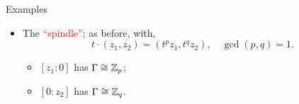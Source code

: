 \begin{frame}{Examples}
    \begin{itemize}
        \item The \textcolor{red}{``spindle''}; as before, with,
        \[
            t \cdot (z_{1}, z_{2}) = (t^{p}z_{1}, t^{q}z_{2}), \quad \gcd(p,q) = 1.
        \]
        
        \begin{itemize}
            \item $[z_{1}:0]$ has $\Gamma \cong \mathbb{Z}_{p}$;
            \item $[0:z_{2}]$ has $\Gamma \cong \mathbb{Z}_{q}$.
        \end{itemize}
    \end{itemize}
\end{frame}